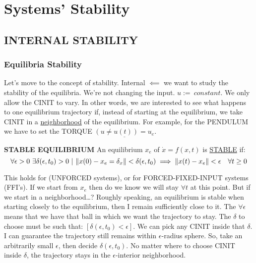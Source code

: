 
\chapter{Systems' Stability}
\label{cap:sysstab}

\section{INTERNAL STABILITY}

\subsection{Equilibria Stability}

Let's move to the concept of stability. Internal $\impliedby$ we want to study the stability of the equilibria. We're not changing the input. $u :=\ constant$. We only allow the CINIT to vary. In other words, we are interested to see what happens to one equilibrium trajectory if, instead of starting at the equilibrium, we take CINIT in a \underline{neighborhood} of the equilibrium. For example, for the PENDULUM we have to set the TORQUE $\underline{(u \neq u(t)) = u_e}$.

\begin{defn}{\textbf{STABLE EQUILIBRIUM}}
\label{stabeq}
An equilibrium $x_e$ of $\dot{x} = f(x,t)$ is \underline{STABLE} if:
\[
	\forall \epsilon > 0\ \exists \delta(\epsilon, t_0) > 0\ |\ \lVert x(0) - x_e = \delta_x\rVert < \delta(\epsilon,t_0) \implies \lVert x(t) - x_e\rVert < \epsilon \quad \forall t \geq 0
\]
\end{defn}

This holds for (UNFORCED systems), or for FORCED-FIXED-INPUT systems (FFI's).
If we start from $x_e$ then do we know we will stay $\forall t$ at this point. But if we start in a neighborhood\dots ? Roughly speaking, an equilibrium is stable when starting closely to the equilibrium, then I remain sufficiently close to it. The $\forall \epsilon$ means that we have that ball in which we want the trajectory to stay.
The $\delta$ to choose must be such that: $[\delta(\epsilon,t_0) < \epsilon]$. 
We can pick any CINIT inside that $\delta$.
I can guarantee the trajectory still remains within $\epsilon$-radius sphere. 
So, take an arbitrarily small $\epsilon$, then decide $\delta(\epsilon,t_0)$. No matter where to choose CINIT inside $\delta$, the trajectory stays in the $\epsilon$-interior neighborhood. 

